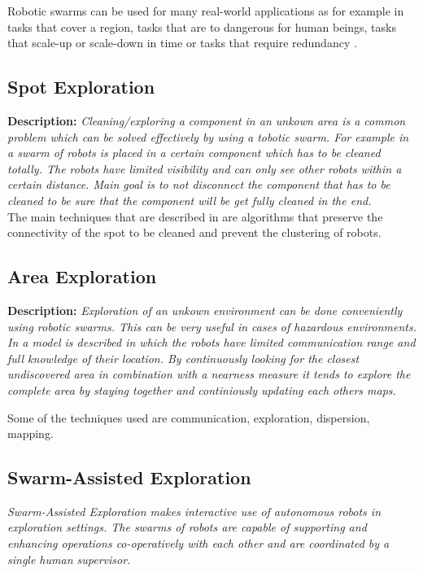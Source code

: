 Robotic swarms can be used for many real-world applications as for example in tasks that cover a region, tasks that are to dangerous for human beings, tasks that scale-up or scale-down in time or tasks that require redundancy \cite{csahin2005swarm}.

  \subsection{Spot Exploration}
  \textbf{Description: }\emph{Cleaning/exploring a component in an unkown area is a common problem which can be solved effectively by using a tobotic swarm. For example in \cite{wagner2008cooperative} a swarm of robots is placed in a certain component which has to be cleaned totally. The robots have limited visibility and can only see other robots within a certain distance. Main goal is to not disconnect the component that has to be cleaned to be sure that the component will be get fully cleaned in the end.} \\
  The main techniques that are described in \cite{wagner2008cooperative} are algorithms that preserve the connectivity of the spot to be cleaned and prevent the clustering of robots.
  
  \subsection{Area Exploration}
  \textbf{Description: }\emph{Exploration of an unkown environment can be done conveniently using robotic swarms. This can be very useful in cases of hazardous environments. In \cite{sheng2006distributed} a model is described in which the robots have limited communication range and full knowledge of their location. By continuously looking for the closest undiscovered area in combination with a nearness measure it tends to explore the complete area by staying together and continiously updating each others maps.} 
  
  Some of the techniques used are communication, exploration, dispersion, mapping. \cite{sheng2006distributed}
  
  \subsection{Swarm-Assisted Exploration}
  \emph{Swarm-Assisted Exploration makes interactive use of autonomous robots in exploration settings. The swarms of robots are capable of supporting and enhancing operations co-operatively with each other and are coordinated by a single human supervisor.}\cite{Naghsh2008,Penders2011}

